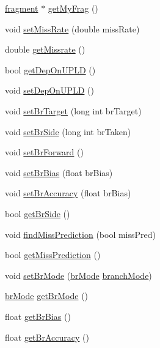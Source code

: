 \begin{DoxyCompactItemize}
\item 
\hyperlink{classfragment}{fragment} $\ast$ \hyperlink{classinstruction_a2057b72a13418796e55377b1cee14439}{getMyFrag} ()
\item 
void \hyperlink{classinstruction_a0b5a3de8a08da1f9e0c9d8cbff5ba8ce}{setMissRate} (double missRate)
\item 
double \hyperlink{classinstruction_a7f04521e22bec22c519fdc44d7c8b83a}{getMissrate} ()
\item 
bool \hyperlink{classinstruction_aa523eec9522b3dfa68918b24c378fcc2}{getDepOnUPLD} ()
\item 
void \hyperlink{classinstruction_a99ed8de1173de1012b31333788a3e1a9}{setDepOnUPLD} ()
\item 
void \hyperlink{classinstruction_abb70bf9067cbb8427efa16050c1fd34a}{setBrTarget} (long int brTarget)
\item 
void \hyperlink{classinstruction_a0cdb2aa4ff688f48a627a3e03baa6aad}{setBrSide} (long int brTaken)
\item 
void \hyperlink{classinstruction_a4e4a5a2f74a5c8420543cd42a0097d64}{setBrForward} ()
\item 
void \hyperlink{classinstruction_a0ee9ec109536e821189c53b82af33000}{setBrBias} (float brBias)
\item 
void \hyperlink{classinstruction_afa5bc75d50f79d6e6af4bf940086357a}{setBrAccuracy} (float brBias)
\item 
bool \hyperlink{classinstruction_a817d20194ce6f6b0d902f965129b5bc7}{getBrSide} ()
\item 
void \hyperlink{classinstruction_ad37eea00676b66636402b18826c4ca2c}{findMissPrediction} (bool missPred)
\item 
bool \hyperlink{classinstruction_a8968b6df9999fd346e9ad67dbb3c24a6}{getMissPrediction} ()
\item 
void \hyperlink{classinstruction_ad7dcd18feb686b41ab57e15e00cf04a6}{setBrMode} (\hyperlink{global_2global_8h_a01e05efee3068c759b10b6181a6065e1}{brMode} \hyperlink{backend_2parser_8cpp_ac7bd9648b0cf77fbafdeb4490e46e7de}{branchMode})
\item 
\hyperlink{global_2global_8h_a01e05efee3068c759b10b6181a6065e1}{brMode} \hyperlink{classinstruction_a5ec270309f416ce62db5ea8e6478819d}{getBrMode} ()
\item 
float \hyperlink{classinstruction_ac75c130a63a934b5e7e6ea4317a92a73}{getBrBias} ()
\item 
float \hyperlink{classinstruction_a4637c7dbd150ddfb700132aba98a8d16}{getBrAccuracy} ()
\item 

\end{DoxyCompactItemize}
